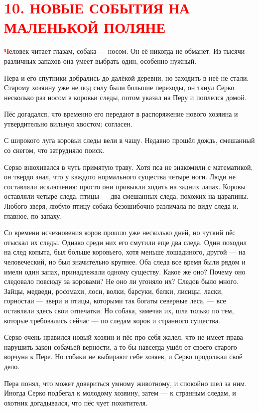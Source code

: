 \documentclass[12pt, a4paper, openany]{book}
\begin{document}
\section[10. Новые события на маленькой поляне]{\center \textcolor{red}{10. НОВЫЕ СОБЫТИЯ НА МАЛЕНЬКОЙ ПОЛЯНЕ}}
	
	\lettrine[findent=0pt]{\textbf{\textcolor{red}{Ч}}}{}еловек читает глазам, собака — носом. Он её никогда не обманет. Из тысячи различных запахов она умеет выбрать один, особенно нужный.
	
	Пера и его спутники добрались до далёкой деревни, но заходить в неё не стали. Старому хозяину уже не под силу были большие переходы, он ткнул Серко несколько раз носом в коровьи следы, потом указал на Перу и поплелся домой.
	
	Пёс догадался, что временно его передают в распоряжение нового хозяина и утвердительно вильнул хвостом: согласен.
	
	С широкого луга коровьи следы вели в чащу. Недавно прошёл дождь, смешанный со снегом, что затрудняло поиск.
	
	Серко внюхивался в чуть примятую траву. Хотя пса не знакомили с математикой, он твердо знал, что у каждого нормального существа четыре ноги. Люди не составляли исключения: просто они привыкли ходить на задних лапах. Коровы оставляли четыре следа, птицы — два смешанных следа, похожих на царапины. Любого зверя, любую птицу собака безошибочно различала по виду следа и, главное, по запаху.
	
	Со времени исчезновения коров прошло уже несколько дней, но чуткий пёс отыскал их следы. Однако среди них его смутили еще два следа. Один походил на след копыта, был больше коровьего, хотя меньше лошадиного, другой — на человеческий, но был значительно крупнее. Оба следа все время были рядом и имели один запах, принадлежали одному существу. Какое же оно? Почему оно следовало повсюду за коровами? Не оно ли угоняло их? Следов было много. Зайцы, медведи, росомахи, лоси, волки, барсуки, белки, лисицы, ласки, горностаи — звери и птицы, которыми так богаты северные леса, — все оставляли здесь свои отпечатки. Но собака, замечая их, шла только по тем, которые требовались сейчас — по следам коров и странного существа.
	
	Серко очень нравился новый хозяин и пёс про себя жалел, что не имеет права нарушить закон собачьей верности, а то бы навсегда ушёл от своего старого ворчуна к Пере. Но собаки не выбирают себе хозяев, и Серко продолжал своё дело.
	
	Пера понял, что может довериться умному животному, и спокойно шел за ним. Иногда Серко подбегал к молодому хозяину, затем — к странным следам, и охотник догадывался, что пёс чует похитителя.
	
\end{document}
